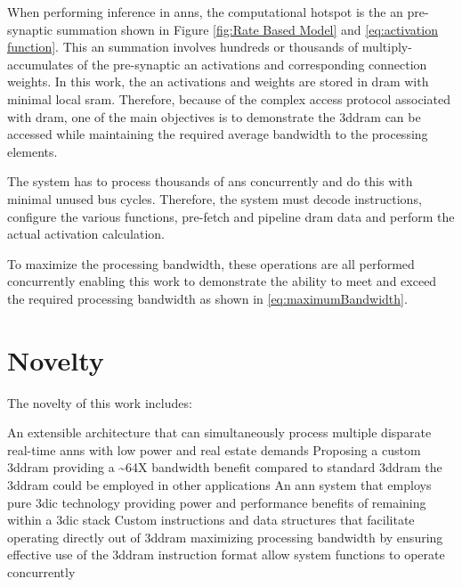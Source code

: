 When performing inference in \acp{ann}, the computational hotspot is the \ac{an} pre-synaptic summation shown in Figure \ref{fig:Rate Based Model} and \eqref{eq:activation function}.
This \ac{an} summation involves hundreds or thousands of multiply-accumulates of the pre-synaptic \ac{an} activations and corresponding connection weights. 
In this work, the \ac{an} activations and weights are stored in \ac{dram} with minimal local \ac{sram}. 
Therefore, because of the complex access protocol associated with \ac{dram}, one of the main objectives is to demonstrate the \ac{3ddram} can be accessed while maintaining the required average bandwidth to the processing elements.
\iffalse with relatively high levels of bus efficiency. \fi

The system has to process thousands of \acp{an} concurrently and do this with minimal unused bus cycles.
Therefore, the system must decode instructions, configure the various functions, pre-fetch and pipeline \ac{dram} data and perform the actual activation calculation. 

To maximize the processing bandwidth, these operations are all performed concurrently enabling this work to demonstrate the ability to meet and exceed the required \iffalse \SI[per-mode=symbol]{32}{\tera \bit \per \second} of\fi processing bandwidth as shown in \eqref{eq:maximumBandwidth}.

\iffalse
The problem associated with processing \acp{ann} are outlined in Section \ref{sec:The Problem}. 
\fi

\section[Novelty]{Novelty}
\label{sec:Novelty}

The novelty of this work includes:
\begin{outline}
    \1 An extensible architecture that can simultaneously process multiple disparate real-time \ac{ann}s 
      \2 with low power and real estate demands
    \1 Proposing a custom \ac{3ddram} providing a \textasciitilde 64X bandwidth benefit compared to standard \ac{3ddram}
      \2 the \ac{3ddram} could be employed in other applications
    \1 An \ac{ann} system that employs pure \ac{3dic} technology
      \2 providing power and performance benefits of remaining within a \ac{3dic} stack
    \1 Custom instructions and data structures that facilitate operating directly out of \ac{3ddram} 
      \2 maximizing processing bandwidth by ensuring effective use of the \ac{3ddram}
      \2 instruction format allow system functions to operate concurrently 
\end{outline}


